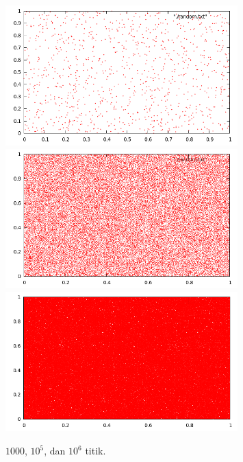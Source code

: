 \documentclass[paper=a4, fontsize=11pt]{scrartcl}
\numberwithin{equation}{section} %
\numberwithin{figure}{section} %
\numberwithin{table}{section} %
\begin{document}
\begin{figure}
	\centering
	\includegraphics[width=0.8\textwidth]{1000.png}
	\includegraphics[width=0.8\textwidth]{100000.png}
	\includegraphics[width=0.8\textwidth]{1jt.png}
	\caption{$1000$, $10^{5}$, dan $10^{6}$ titik.}
\end{figure}
\end{document}

